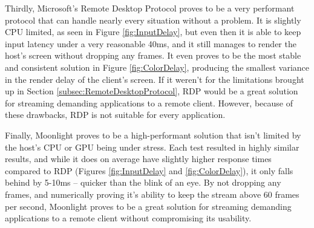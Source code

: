 Thirdly, Microsoft's Remote Desktop Protocol proves to be a very performant protocol that can handle nearly every situation without a problem.
It is slightly CPU limited, as seen in Figure \ref{fig:InputDelay}, but even then it is able to keep input latency under a very reasonable 40ms, and it still manages to render the host's screen without dropping any frames.
It even proves to be the most stable and consistent solution in Figure \ref{fig:ColorDelay}, producing the smallest variance in the render delay of the client's screen.
If it weren't for the limitations brought up in Section \ref{subsec:RemoteDesktopProtocol}, RDP would be a great solution for streaming demanding applications to a remote client.
However, because of these drawbacks, RDP is not suitable for every application.

Finally, Moonlight proves to be a high-performant solution that isn't limited by the host's CPU or GPU being under stress.
Each test resulted in highly similar results, and while it does on average have slightly higher response times compared to RDP (Figures \ref{fig:InputDelay} and \ref{fig:ColorDelay}), it only falls behind by 5-10ms -- quicker than the blink of an eye.
By not dropping any frames, and numerically proving it's ability to keep the stream above 60 frames per second, Moonlight proves to be a great solution for streaming demanding applications to a remote client without compromising its usability.